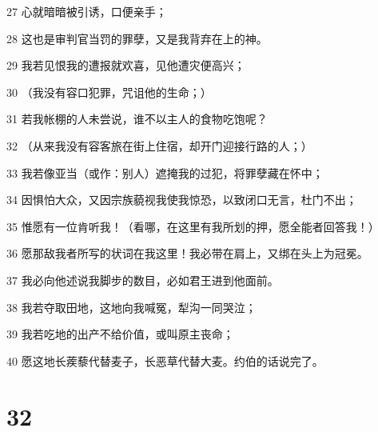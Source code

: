 \par 27 心就暗暗被引诱，口便亲手；
\par 28 这也是审判官当罚的罪孽，又是我背弃在上的神。
\par 29 我若见恨我的遭报就欢喜，见他遭灾便高兴；
\par 30 （我没有容口犯罪，咒诅他的生命；）
\par 31 若我帐棚的人未尝说，谁不以主人的食物吃饱呢？
\par 32 （从来我没有容客旅在街上住宿，却开门迎接行路的人；）
\par 33 我若像亚当（或作：别人）遮掩我的过犯，将罪孽藏在怀中；
\par 34 因惧怕大众，又因宗族藐视我使我惊恐，以致闭口无言，杜门不出；
\par 35 惟愿有一位肯听我！（看哪，在这里有我所划的押，愿全能者回答我！）
\par 36 愿那敌我者所写的状词在我这里！我必带在肩上，又绑在头上为冠冕。
\par 37 我必向他述说我脚步的数目，必如君王进到他面前。
\par 38 我若夺取田地，这地向我喊冤，犁沟一同哭泣；
\par 39 我若吃地的出产不给价值，或叫原主丧命；
\par 40 愿这地长蒺藜代替麦子，长恶草代替大麦。约伯的话说完了。

\chapter{32}


